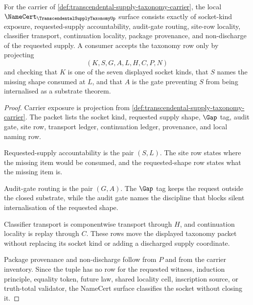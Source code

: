 \begin{theorem}
\label{thm:transcendental-supply-taxonomy-namecert-obligations}
For the carrier of \autoref{def:transcendental-supply-taxonomy-carrier}, the local $\NameCert_{\TranscendentalSupplyTaxonomyUp}$ surface consists exactly of socket-kind exposure, requested-supply accountability, audit-gate routing, site-row locality, classifier transport, continuation locality, package provenance, and non-discharge of the requested supply. A consumer accepts the taxonomy row only by projecting
$$
(K,S,G,A,L,H,C,P,N)
$$
and checking that $K$ is one of the seven displayed socket kinds, that $S$ names the missing shape consumed at $L$, and that $A$ is the gate preventing $S$ from being internalised as a substrate theorem.
\end{theorem}
\begin{proof}
Carrier exposure is projection from \autoref{def:transcendental-supply-taxonomy-carrier}. The packet lists the socket kind, requested supply shape, $\Gap$ tag, audit gate, site row, transport ledger, continuation ledger, provenance, and local naming row.

Requested-supply accountability is the pair $(S,L)$. The site row states where the missing item would be consumed, and the requested-shape row states what the missing item is.

Audit-gate routing is the pair $(G,A)$. The $\Gap$ tag keeps the request outside the closed substrate, while the audit gate names the discipline that blocks silent internalisation of the requested shape.

Classifier transport is componentwise transport through $H$, and continuation locality is replay through $C$. These rows move the displayed taxonomy packet without replacing its socket kind or adding a discharged supply coordinate.

Package provenance and non-discharge follow from $P$ and from the carrier inventory. Since the tuple has no row for the requested witness, induction principle, equality token, future law, shared locality cell, inscription source, or truth-total validator, the NameCert surface classifies the socket without closing it.
\end{proof}

